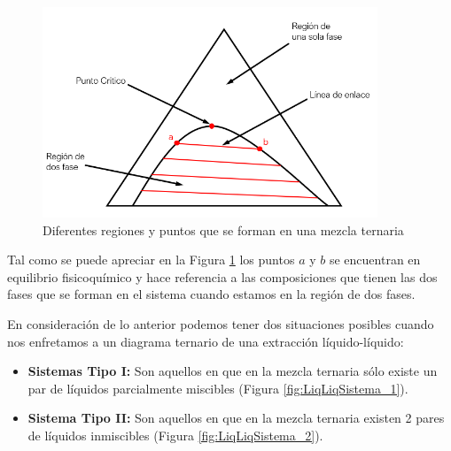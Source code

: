 \documentclass[11pt]{book}
\begin{document}
\begin{figure}
    \centering
    \includegraphics[width = 10cm]{img/LiquidoLiquido/DiagramaTriangular_Puntos.PNG}
    \caption{Diferentes regiones y puntos que se forman en una mezcla ternaria}
    \label{fig:MezclaTernaria}
\end{figure}

Tal como se puede apreciar en la Figura \ref{fig:MezclaTernaria} los puntos $a$ y $b$ se encuentran en equilibrio fisicoquímico y hace referencia a las composiciones que tienen las dos fases que se forman en el sistema cuando estamos en la región de dos fases. 

En consideración de lo anterior podemos tener dos situaciones posibles cuando nos enfretamos a un diagrama ternario de una extracción líquido-líquido:

\begin{itemize}
    \item \textbf{Sistemas Tipo I:} Son aquellos en que en la mezcla ternaria sólo existe un par de líquidos parcialmente miscibles (Figura \ref{fig:LiqLiqSistema_1}).
    
    \item \textbf{Sistema Tipo II:} Son aquellos en que en la mezcla ternaria existen 2 pares de líquidos inmiscibles (Figura \ref{fig:LiqLiqSistema_2}).
\end{itemize}
\end{document}
